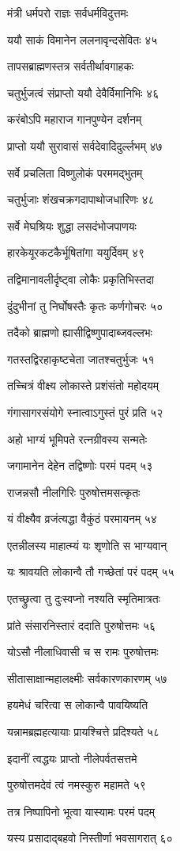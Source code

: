 मंत्री धर्मपरो राज्ञः सर्वधर्मविदुत्तमः

ययौ साकं विमानेन ललनावृन्दसेवितः ४५

तापसब्राह्मणस्तत्र सर्वतीर्थावगाहकः

चतुर्भुजत्वं संप्राप्तो ययौ देवैर्विमानिभिः ४६

करंबोऽपि महाराज गानपुण्येन दर्शनम्

प्राप्तो ययौ सुरावासं सर्वदेवादिदुर्ल्लभम् ४७

सर्वे प्रचलिता विष्णुलोकं परममद्भुतम्

चतुर्भुजाः शंखचक्रगदापाथोजधारिणः ४८

सर्वे मेघश्रियः शुद्धा लसदंभोजपाणयः

हारकेयूरकटकैर्भूषितांगा ययुर्दिवम् ४९

तद्विमानावलीर्दृष्ट्वा लोकैः प्रकृतिभिस्तदा

दुंदुभीनां तु निर्घोषस्तैः कृतः कर्णगोचरः ५०

तदैको ब्राह्मणो ह्यासीद्विष्णुपादाब्जवल्लभः

गतस्तद्विरहाकृष्टचेता जातश्चतुर्भुजः ५१

तच्चित्रं वीक्ष्य लोकास्ते प्रशंसंतो महोदयम्

गंगासागरसंयोगे स्नात्वाऽगुस्तं पुरं प्रति ५२

अहो भाग्यं भूमिपते रत्नग्रीवस्य सन्मतेः

जगामानेन देहेन तद्विष्णोः परमं पदम् ५३

राजन्नसौ नीलगिरिः पुरुषोत्तमसत्कृतः

यं वीक्ष्यैव व्रजंत्यद्धा वैकुंठं परमायनम् ५४

एतन्नीलस्य माहात्म्यं यः शृणोति स भाग्यवान्

यः श्रावयति लोकान्वै तौ गच्छेतां परं पदम् ५५

एतच्छ्रुत्वा तु दुःस्वप्नो नश्यति स्मृतिमात्रतः

प्रांते संसारनिस्तारं ददाति पुरुषोत्तमः ५६

योऽसौ नीलाधिवासी च स रामः पुरुषोत्तमः

सीतासाक्षान्महालक्ष्मीः सर्वकारणकारणम् ५७

हयमेधं चरित्वा स लोकान्वै पावयिष्यति

यन्नामब्रह्महत्यायाः प्रायश्चित्ते प्रदिश्यते ५८

इदानीं त्वद्धयः प्राप्तो नीलेपर्वतसत्तमे

पुरुषोत्तमदेवं त्वं नमस्कुरु महामते ५९

तत्र निष्पापिनो भूत्वा यास्यामः परमं पदम्

यस्य प्रसादाद्बहवो निस्तीर्णा भवसागरात् ६०

